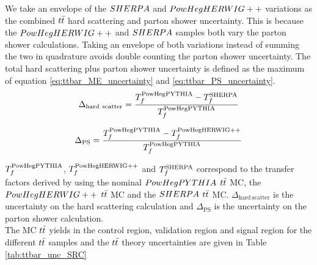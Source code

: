 \indent We take an envelope of the $SHERPA$ and $PowHegHERWIG++$ variations as the combined $t\bar{t}$ hard scattering and parton shower uncertainty.  This is because the $PowHegHERWIG++$ and $SHERPA$ samples both vary the parton shower calculations.  Taking an envelope of both variations instead of summing the two in quadrature avoids double counting the parton shower uncertainty. The total hard scattering plus parton shower uncertainty is defined as the maximum of equation \ref{eq:ttbar_ME_uncertainty} and \ref{eq:ttbar_PS_uncertainty}.  \\

    \begin{eqnarray}
      \Delta_{\mathrm{hard~scatter}} = \frac{T_f^{\mathrm{PowHegPYTHIA}} - T_f^{\mathrm{SHERPA}}}{T_f^{\mathrm{PowHegPYTHIA}}}
      \label{eq:ttbar_ME_uncertainty}
    \end{eqnarray}

    \begin{eqnarray}
      \Delta_{\mathrm{PS}} = \frac{T_f^{\mathrm{PowHegPYTHIA}} - T_f^{\mathrm{PowHegHERWIG++}}}{T_f^{\mathrm{PowHegPYTHIA}}}
      \label{eq:ttbar_PS_uncertainty}
    \end{eqnarray}

\indent $T_f^{\mathrm{PowHegPYTHIA}}$, $T_f^{\mathrm{PowHegHERWIG++}}$ and $T_f^{\mathrm{SHERPA}}$ correspond to the transfer factors derived by using the nominal $PowHegPYTHIA$ $t\bar{t}$ MC, the $PowHegHERWIG++$ $t\bar{t}$ MC and the $SHERPA$ $t\bar{t}$ MC.  $\Delta_{\mathrm{hard~scatter}}$ is the uncertainty on the hard scattering calculation and $\Delta_{\mathrm{PS}}$ is the uncertainty on the parton shower calculation. \\

\indent The MC $t\bar{t}$ yields in the control region, validation region and signal region for the different $t\bar{t}$ samples and the $t\bar{t}$ theory uncertainties are given in Table \ref{tab:ttbar_unc_SRC}  \\

\pagebreak
  
